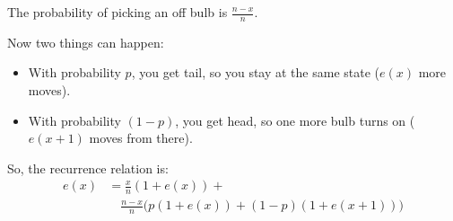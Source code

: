{\begin{itemize}
{    The probability of picking an off bulb is $\frac{n-x}{n}$.

    \par
    Now two things can happen:
    \begin{itemize}
        \item With probability $p$, you get tail, so you stay at the same state ($e(x)$ more moves).
        \item With probability $(1-p)$, you get head, so one more bulb turns on ($e(x+1)$ moves from there).
    \end{itemize}

    \par
    So, the recurrence relation is:
    \begin{align*}
    e(x) &= \frac{x}{n} (1 + e(x)) + \\
         & \quad \frac{n-x}{n} \big( p(1 + e(x)) + (1-p)(1 + e(x+1)) \big)
    \end{align*}
}
\end{itemize}
}
